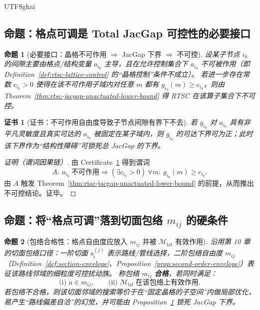 \documentclass[12pt]{article}
\newtheorem{proposition}{命题}[section]
\newtheorem{certificate}{证书}[section]
\newcommand{\RTSC}{\textsf{RTSC}}
\begin{document}
\begin{CJK*}{UTF8}{gkai}
\subsection{命题：格点可调是 Total JacGap 可控性的必要接口}

\begin{proposition}[必要接口：晶格不可作用 $\Rightarrow$ JacGap 下界 $\Rightarrow$ 不可控]
\label{prop:rtsc-lattice-necessary}
设某子节点 $i_0$ 的间隙主要由格点/结构变量 $a_{i_0}$ 主导，且在允许控制集合下 $a_{i_0}$ 不可被作用（即 Definition~\ref{def:rtsc-lattice-control}
  的“晶格控制”条件不成立）。
若进一步存在常数 $c_{i_0}>0$ 使得在该不可作用子域内对任意 $m$ 都有 $g_{i_0}(m)\ge c_{i_0}$，则由 Theorem~\ref{thm:rtsc-jacgap-unactuated-lower-bound} 得 \RTSC{} 在该算子集合下不可控。
\end{proposition}

\begin{certificate}[证书：不可作用自由度导致子节点间隙有界下不去]
\label{cert:rtsc-lattice-necessary}
若 $g_{i_0}$ 对 $a_{i_0}$ 具有非平凡灵敏度且真实可达的 $a_{i_0}$ 被固定在某子域内，则 $g_{i_0}$ 的可达下界可为正；此时该下界作为“结构性障碍”可锁死总 JacGap 的下界。
\end{certificate}

\begin{proof}[证明（谓词因果链）]
由 Certificate~\ref{cert:rtsc-lattice-necessary} 得到谓词
\[
A:\ a_{i_0}\ \text{不可作用}\Rightarrow (\exists c_{i_0}>0)\ \forall m:\ g_{i_0}(m)\ge c_{i_0}.
\]
由 $A$ 触发 Theorem~\ref{thm:rtsc-jacgap-unactuated-lower-bound} 的前提，从而推出不可控结论。证毕。
\end{proof}

\subsection{命题：将“格点可调”落到切面包络 $m_{ij}$ 的硬条件}

\begin{proposition}[包络合格性：格点自由度应放入 $m_{ij}$ 并被 $\mathcal{M}_{\mathrm{lat}}$ 有效作用]
\label{prop:rtsc-envelope-lattice-qualified}
沿用第 10 章的切面包络口径：一阶切面 $s_i^{(j)}$ 表示路线/管线选择，二阶包络自由度 $m_{ij}$（Definition~\ref{def:section-envelope}、Proposition~\ref{prop:second-order-envelope}）表征该路线邻域的细粒度可控扰动族。
称包络 $m_{ij}$ \textbf{合格}，若同时满足：
\[
\text{(i) }a\in m_{ij},\qquad
\text{(ii) }\mathcal{M}_{\mathrm{lat}}\ \text{在该包络上有效作用}.
\]
若包络不合格，则该切面邻域的搜索等价于在“固定晶格的子空间”内做局部优化，易产生“路线偏差自洽”的幻觉，并可能由 Proposition~\ref{prop:rtsc-lattice-necessary} 锁死 JacGap 下界。
\end{proposition}


\end{CJK*}
\end{document}
